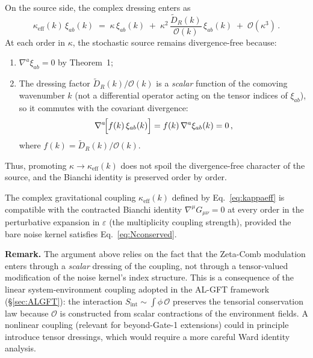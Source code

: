 \documentclass[12pt,a4paper]{article}
\begin{document}
On the source side, the complex dressing enters as
%
\begin{equation}
  \kappa_{\mathrm{eff}}(k)\, \xi_{ab}(k)
  \;=\;
  \kappa\,\xi_{ab}(k)
  \;+\;
  \kappa^2\,
  \frac{\widetilde{D}_{\!R}(k)}{\mathcal{O}(k)}\,
  \xi_{ab}(k)
  \;+\;
  \mathcal{O}(\kappa^3)\,.
  \label{eq:dressedxi}
\end{equation}
%
At each order in $\kappa$, the stochastic source remains divergence-free
because:
%
\begin{enumerate}
  \item $\nabla^a \xi_{ab} = 0$ by Theorem~1;
  \item The dressing factor
    $\widetilde{D}_{\!R}(k)/\mathcal{O}(k)$ is a \emph{scalar}
    function of the comoving wavenumber $k$ (not a differential
    operator acting on the tensor indices of $\xi_{ab}$), so
    it commutes with the covariant divergence:
    \begin{equation}
      \nabla^a\!
      \Bigl[
        f(k)\,\xi_{ab}(k)
      \Bigr]
      =
      f(k)\,\nabla^a \xi_{ab}(k)
      = 0\,,
      \label{eq:scalarcommute}
    \end{equation}
    where $f(k) = \widetilde{D}_{\!R}(k)/\mathcal{O}(k)$.
\end{enumerate}
%
Thus, promoting $\kappa \to \kappa_{\mathrm{eff}}(k)$ does not
spoil the divergence-free character of the source, and the Bianchi
identity is preserved order by order.

\begin{tcolorbox}[colback=blue!3, colframe=blue!40, title={Corollary (Bianchi compatibility)}]
The complex gravitational coupling $\kappa_{\mathrm{eff}}(k)$ defined
by Eq.~\eqref{eq:kappaeff} is compatible with the contracted Bianchi
identity $\nabla^\mu G_{\mu\nu} = 0$ at every order in the perturbative
expansion in $\varepsilon$ (the multiplicity coupling strength), provided
the bare noise kernel satisfies Eq.~\eqref{eq:Nconserved}.
\end{tcolorbox}

\noindent
\textbf{Remark.}
The argument above relies on the fact that the Zeta-Comb modulation
enters through a \emph{scalar} dressing of the coupling, not through a
tensor-valued modification of the noise kernel's index structure.
This is a consequence of the linear system-environment coupling adopted
in the AL-GFT framework (\S\ref{sec:ALGFT}): the interaction
$S_{\mathrm{int}} \sim \int \phi\, \mathcal{O}$ preserves the
tensorial conservation law because $\mathcal{O}$ is constructed from
scalar contractions of the environment fields.  A nonlinear coupling
(relevant for beyond-Gate-1 extensions) could in principle introduce
tensor dressings, which would require a more careful Ward identity
analysis.
\end{document}
